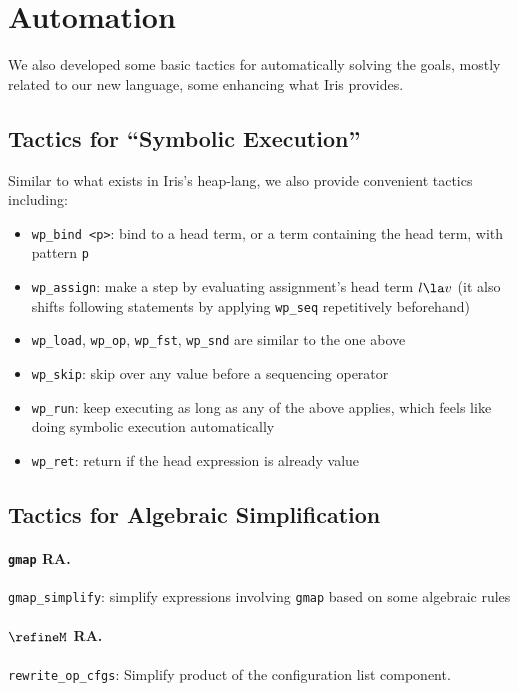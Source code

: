 \section{Automation}
\label{sec:auto}

We also developed some basic tactics for automatically solving the goals,
mostly related to our new language, some enhancing what Iris provides.

\subsection{Tactics for ``Symbolic Execution''}

Similar to what exists in Iris's heap-lang, we also provide convenient tactics
including:

\begin{itemize}
    \item \texttt{wp\_bind <p>}: bind to a head term, or a term containing the head term, with pattern \texttt{p}
    \item \texttt{wp\_assign}: make a step by evaluating assignment's head term $l \la v$
        (it also shifts following statements by applying \texttt{wp\_seq} repetitively beforehand)
    \item \texttt{wp\_load}, \texttt{wp\_op}, \texttt{wp\_fst}, \texttt{wp\_snd} are similar to the one above
    \item \texttt{wp\_skip}: skip over any value before a sequencing operator
    \item \texttt{wp\_run}: keep executing as long as any of the above applies, which feels like doing
      symbolic execution automatically
    \item \texttt{wp\_ret}: return if the head expression is already value
\end{itemize}

\subsection{Tactics for Algebraic Simplification}

\paragraph{\texttt{gmap} RA.}

\texttt{gmap\_simplify}: simplify expressions involving \texttt{gmap} based on some algebraic rules

\paragraph{$\refineM$ RA.}

\texttt{rewrite_op_cfgs}: Simplify product of the configuration list component.

